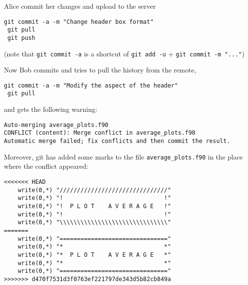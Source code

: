 \documentclass[a4paper,10pt]{article}
\begin{document}
Alice commit her changes and upload to the server

\begin{lstlisting}[style=Alice]
 git commit -a -m "Change header box format"
 git pull
 git push
\end{lstlisting}
(note that \texttt{git commit -a} is a shortcut of \texttt{git add -u} + \texttt{git commit -m "..."})

Now Bob commits and tries to pull the history from the remote,

\begin{lstlisting}[style=Bob]
 git commit -a -m "Modify the aspect of the header"
 git pull
\end{lstlisting}
and gets the following warning:

\begin{lstlisting}[style=Output]
Auto-merging average_plots.f90
CONFLICT (content): Merge conflict in average_plots.f90
Automatic merge failed; fix conflicts and then commit the result.
\end{lstlisting}

Moreover, git has added some marks to the file \texttt{average\_plots.f90} in the place where the conflict appeared:

\begin{lstlisting}[style=Text]
<<<<<<< HEAD
    write(0,*) "///////////////////////////////"
    write(0,*) "!                             !"
    write(0,*) "!  P L O T    A V E R A G E   !"
    write(0,*) "!                             !"
    write(0,*) "\\\\\\\\\\\\\\\\\\\\\\\\\\\\\\\"
=======
    write(0,*) "==============================="
    write(0,*) "*                             *"
    write(0,*) "*  P L O T    A V E R A G E   *"
    write(0,*) "*                             *"
    write(0,*) "==============================="
>>>>>>> d470f7531d3f0763ef221797de343d5b82cb849a
\end{lstlisting}
\end{document}
